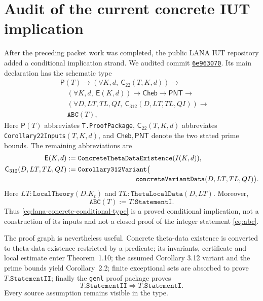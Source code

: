 \section{Audit of the current concrete IUT implication}
\label{sec:iut-current-concrete-implication}

After the preceding packet work was completed, the public LANA IUT
repository added a conditional implication strand.  We audited commit
\href{https://github.com/lana-agents/iut/tree/6e963070c73c5defd1012320deccc777e2555d22}
{\texttt{6e963070}}.  Its main declaration has
the schematic type
\begin{equation}\label{eq:lana-concrete-conditional-type}
\begin{split}
 &\mathsf P(T)\to(\forall K,d,\ \mathsf C_{22}(T,K,d))\to\\
 &\quad(\forall K,d,\ \mathsf E(K,d))\to
 \mathsf{Cheb}\to\mathsf{PNT}\to\\
 &\quad(\forall D,LT,TL,QI,\ \mathsf C_{312}(D,LT,TL,QI))\to\\
 &\quad \texttt{ABC}(T),
\end{split}
\end{equation}
Here $\mathsf P(T)$ abbreviates \texttt{T.ProofPackage},
$\mathsf C_{22}(T,K,d)$ abbreviates \texttt{Corollary22Inputs}$(T,K,d)$,
and $\mathsf{Cheb},\mathsf{PNT}$ denote the two stated prime bounds.  The
remaining abbreviations are
\[
\begin{aligned}
 \mathsf E(K,d)&:=
   \texttt{ConcreteThetaDataExistence}(I(K,d)),\\
 \mathsf C_{312}(D,LT,TL,QI)&:=
   \texttt{Corollary312Variant}\bigl(\\[-2pt]
 &\hspace{35mm}\texttt{concreteVariantData}(D,LT,TL,QI)\bigr).
\end{aligned}
\]
Here $LT:\texttt{LocalTheory}(D.K_t)$ and
$TL:\texttt{ThetaLocalData}(D,LT)$.  Moreover,
\[
                \texttt{ABC}(T):=T.\texttt{StatementI}.
\]
Thus \eqref{eq:lana-concrete-conditional-type} is a proved conditional
implication, not a construction of its inputs and not a closed proof of the
integer statement \eqref{eq:abc}.

The proof graph is nevertheless useful.  Concrete theta-data existence is
converted to theta-data existence restricted by a predicate; its invariants,
certificate and local estimate enter Theorem~1.10; the assumed Corollary
3.12 variant and the prime bounds yield Corollary~2.2; finite exceptional
sets are absorbed to prove $T.\texttt{StatementII}$; finally the
\texttt{genl} proof package proves
\[
        T.\texttt{StatementII}\Longrightarrow T.\texttt{StatementI}.
\]
Every source assumption remains visible in the type.

